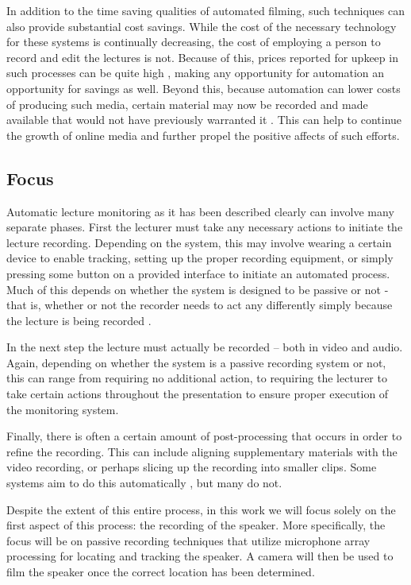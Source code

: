 \documentclass{uiucecethesis09}
\begin{document}
    In addition to the time saving qualities of automated filming, such techniques
    can also provide substantial cost savings. While the cost of the necessary
    technology for these systems is continually decreasing, the cost of employing a
    person to record and edit the lectures is not. Because of this, prices reported
    for upkeep in such processes can be quite high \cite{Liu:2001}, making any
    opportunity for automation an opportunity for savings as well.  Beyond this,
    because automation can lower costs of producing such media, certain material may
    now be recorded and made available that would not have previously warranted it
    \cite{Bianchi:AVP}. This can help to continue the growth of online media and
    further propel the positive affects of such efforts. 

  \subsection{Focus}
    
    Automatic lecture monitoring as it has been described clearly can involve
    many separate phases. First the lecturer must take any necessary actions to
    initiate the lecture recording. Depending on the system, this may involve
    wearing a certain device to enable tracking, setting up the proper recording
    equipment, or simply pressing some button on a provided interface to
    initiate an automated process. Much of this depends on whether the system is
    designed to be passive or not - that is, whether or not the recorder needs
    to act any differently simply because the lecture is being recorded
    \cite{passivecapture}. 

    In the next step the lecture must actually be recorded -- both in video and
    audio. Again, depending on whether the system is a passive recording system or
    not, this can range from requiring no additional action, to requiring the
    lecturer to take certain actions throughout the presentation to ensure proper
    execution of the monitoring system.

    Finally, there is often a certain amount of post-processing that occurs in order
    to refine the recording.  This can include aligning supplementary materials with
    the video recording, or perhaps slicing up the recording into smaller clips.
    Some systems aim to do this automatically \cite{passivecapture}, but many do
    not.

    Despite the extent of this entire process, in this work we will focus solely on
    the first aspect of this process: the recording of the speaker. More
    specifically, the focus will be on passive recording techniques that utilize
    microphone array processing for locating and tracking the speaker. A camera will
    then be used to film the speaker once the correct location has been determined. 
\end{document}
